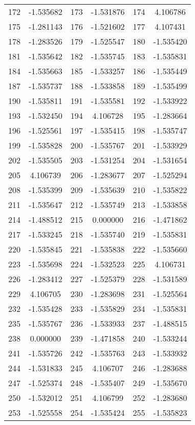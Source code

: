 \documentclass[12pt]{article}
\begin{document}
\begin{longtable}{@{}cc|cc|cc@{}}
172 & -1.535682 & 173 & -1.531876 & 174 & 4.106786 \\
175 & -1.281143 & 176 & -1.521602 & 177 & 4.107431 \\
178 & -1.283526 & 179 & -1.525547 & 180 & -1.535420 \\
181 & -1.535642 & 182 & -1.535745 & 183 & -1.535831 \\
184 & -1.535663 & 185 & -1.533257 & 186 & -1.535449 \\
187 & -1.535737 & 188 & -1.533858 & 189 & -1.535499 \\
190 & -1.535811 & 191 & -1.535581 & 192 & -1.533922 \\
193 & -1.532450 & 194 & 4.106728 & 195 & -1.283664 \\
196 & -1.525561 & 197 & -1.535415 & 198 & -1.535747 \\
199 & -1.535828 & 200 & -1.535767 & 201 & -1.533929 \\
202 & -1.535505 & 203 & -1.531254 & 204 & -1.531654 \\
205 & 4.106739 & 206 & -1.283677 & 207 & -1.525294 \\
208 & -1.535399 & 209 & -1.535639 & 210 & -1.535822 \\
211 & -1.535647 & 212 & -1.535749 & 213 & -1.533858 \\
214 & -1.488512 & 215 & 0.000000 & 216 & -1.471862 \\
217 & -1.533245 & 218 & -1.535740 & 219 & -1.535831 \\
220 & -1.535845 & 221 & -1.535838 & 222 & -1.535660 \\
223 & -1.535698 & 224 & -1.532523 & 225 & 4.106731 \\
226 & -1.283412 & 227 & -1.525379 & 228 & -1.531589 \\
229 & 4.106705 & 230 & -1.283698 & 231 & -1.525564 \\
232 & -1.535428 & 233 & -1.535829 & 234 & -1.535831 \\
235 & -1.535767 & 236 & -1.533933 & 237 & -1.488515 \\
238 & 0.000000 & 239 & -1.471858 & 240 & -1.533244 \\
241 & -1.535726 & 242 & -1.535763 & 243 & -1.533932 \\
244 & -1.531833 & 245 & 4.106707 & 246 & -1.283688 \\
247 & -1.525374 & 248 & -1.535407 & 249 & -1.535670 \\
250 & -1.532012 & 251 & 4.106799 & 252 & -1.283680 \\
253 & -1.525558 & 254 & -1.535424 & 255 & -1.535823 \\

\end{longtable}
\end{document}

